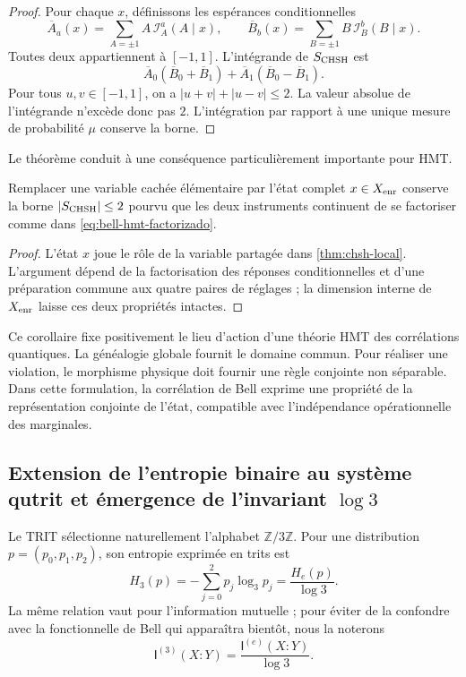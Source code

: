 \begin{proof}
Pour chaque \(x\), définissons les espérances conditionnelles
\[
 \overline A_a(x)=\sum_{A=\pm1}A\,\mathcal I_A^a(A\mid x),
 \qquad
 \overline B_b(x)=\sum_{B=\pm1}B\,\mathcal I_B^b(B\mid x).
\]
Toutes deux appartiennent à \([-1,1]\). L’intégrande de \(S_{\rm CHSH}\) est
\[
 \overline A_0(\overline B_0+\overline B_1)
 +\overline A_1(\overline B_0-\overline B_1).
\]
Pour tous \(u,v\in[-1,1]\), on a \(\lvert u+v\rvert+\lvert u-v\rvert\leq2\). La valeur absolue de l’intégrande n’excède donc pas \(2\). L’intégration par rapport à une unique mesure de probabilité \(\mu\) conserve la borne.
\end{proof}

Le théorème conduit à une conséquence particulièrement importante pour HMT.

\begin{corollary}
\label{cor:no-go-bell-memoria}
Remplacer une variable cachée élémentaire par l’état complet \(x\in X_{\rm enr}\) conserve la borne \(\lvert S_{\rm CHSH}\rvert\leq2\) pourvu que les deux instruments continuent de se factoriser comme dans \eqref{eq:bell-hmt-factorizado}.
\end{corollary}

\begin{proof}
L’état \(x\) joue le rôle de la variable partagée dans \cref{thm:chsh-local}. L’argument dépend de la factorisation des réponses conditionnelles et d’une préparation commune aux quatre paires de réglages ; la dimension interne de \(X_{\rm enr}\) laisse ces deux propriétés intactes.
\end{proof}

Ce corollaire fixe positivement le lieu d’action d’une théorie HMT des corrélations quantiques. La généalogie globale fournit le domaine commun. Pour réaliser une violation, le morphisme physique doit fournir une règle conjointe non séparable. Dans cette formulation, la corrélation de Bell exprime une propriété de la représentation conjointe de l’état, compatible avec l’indépendance opérationnelle des marginales.

\subsection{Extension de l’entropie binaire au système qutrit et émergence de l’invariant \(\log 3\)}

Le TRIT sélectionne naturellement l’alphabet \(\mathbb Z/3\mathbb Z\). Pour une distribution \(p=(p_0,p_1,p_2)\), son entropie exprimée en trits est
\begin{equation}
 H_3(p)=-\sum_{j=0}^{2}p_j\log_3p_j
       =\frac{H_e(p)}{\log 3}.
 \label{eq:entropia-base-tres}
\end{equation}
La même relation vaut pour l’information mutuelle ; pour éviter de la confondre avec la fonctionnelle de Bell qui apparaîtra bientôt, nous la noterons
\[
 \mathsf I^{(3)}(X:Y)
 =\frac{\mathsf I^{(e)}(X:Y)}{\log 3}.
\]

